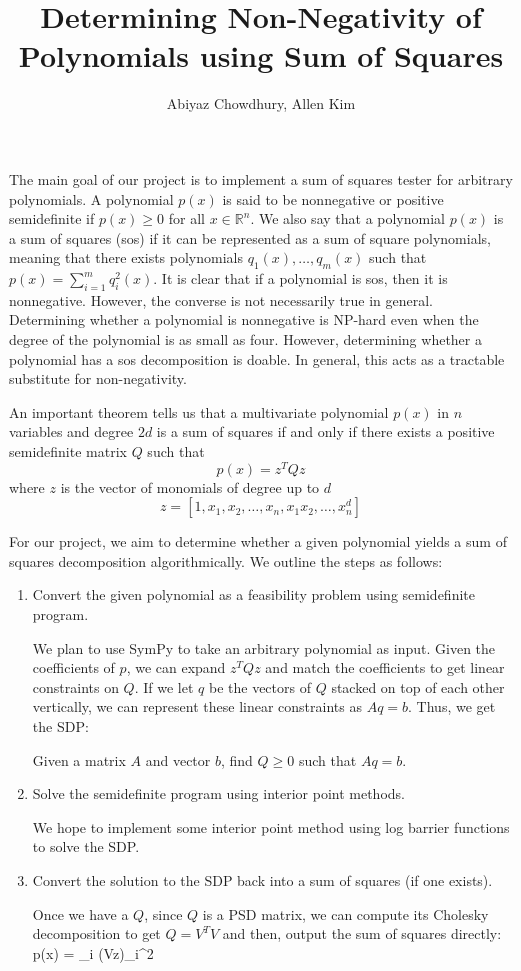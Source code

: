 \documentclass[12pt]{article}
\title{\vspace{-2.0cm}Determining Non-Negativity of Polynomials using Sum of Squares}
\date{}
\author{Abiyaz Chowdhury, Allen Kim}
\begin{document}
\maketitle
\vspace{-0.5cm}

The main goal of our project is to implement a sum of squares tester for
arbitrary polynomials. A polynomial $p(x)$ is said to be nonnegative or positive
semidefinite if $p(x) \ge 0$ for all $x \in \mathbb{R}^n$. We also say that a
polynomial $p(x)$ is a sum of squares (sos) if it can be represented as a sum of
square polynomials, meaning that there exists polynomials $q_1(x),\ldots,q_m(x)$
such that $p(x) = \sum_{i=1}^m q_i^2(x)$. It is clear that if a polynomial is
sos, then it is nonnegative. However, the converse is not necessarily true in
general. Determining whether a polynomial is nonnegative is NP-hard even when
the degree of the polynomial is as small as four. However, determining whether a
polynomial has a sos decomposition is doable. In general, this acts as a
tractable substitute for non-negativity.

An important theorem tells us that a multivariate polynomial $p(x)$ in $n$
variables and degree $2d$ is a sum of squares if and only if there exists a
positive semidefinite matrix $Q$ such that $$p(x) = z^T Q z$$ where $z$ is the
vector of monomials of degree up to $d$ $$z = [1,x_1,x_2,\ldots,x_n, x_1x_2,
\ldots, x_n^d]$$

For our project, we aim to determine whether a given polynomial yields a sum of
squares decomposition algorithmically. We outline the steps as follows:
\begin{enumerate}
	\item Convert the given polynomial as a feasibility problem using
	semidefinite program. 
	
	We plan to use SymPy to take an arbitrary polynomial as input. Given the
	coefficients of $p$, we can expand $z^TQz$ and match the coefficients to 
	get linear constraints on $Q$. If we let $q$ be the vectors of $Q$ stacked
	on top of each other vertically, we can represent these linear constraints
	as $Aq = b$. Thus, we get the SDP:
	\begin{center}
	Given a matrix $A$ and vector $b$, find $Q \ge 0$ such that $Aq=b$.
	\end{center}

	\item Solve the semidefinite program using interior point methods.

	We hope to implement some interior point method using log barrier functions
	to solve the SDP.

	\item Convert the solution to the SDP back into a sum of squares (if one
	exists).

	Once we have a $Q$, since $Q$ is a PSD matrix, we can compute its Cholesky
	decomposition to get $Q = V^TV$ and then, output the sum of squares
	directly: $$p(x) = \sum_i (Vz)_i^2

\end{enumerate}
\end{document}
